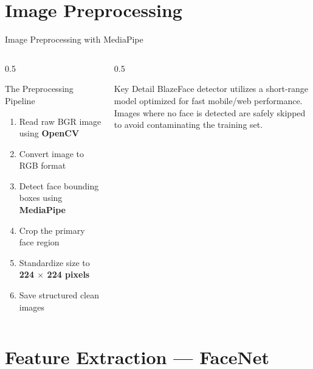 \documentclass[aspectratio=169]{beamer}
\begin{document}
\section{Image Preprocessing}

\begin{frame}{Image Preprocessing with MediaPipe}
  \begin{columns}
    \begin{column}{0.5\textwidth}
      \begin{block}{The Preprocessing Pipeline}
        \begin{enumerate}
          \item Read raw BGR image using \textbf{OpenCV}
          \item Convert image to RGB format
          \item Detect face bounding boxes using \textbf{MediaPipe}
          \item Crop the primary face region
          \item Standardize size to \textbf{224 $\times$ 224 pixels}
          \item Save structured clean images
        \end{enumerate}
      \end{block}
    \end{column}
    \begin{column}{0.5\textwidth}
      \begin{block}{Key Detail}
        BlazeFace detector utilizes a short-range model optimized for fast mobile/web performance.
        \\[0.5em]
        Images where no face is detected are safely skipped to avoid contaminating the training set.
      \end{block}
    \end{column}
  \end{columns}
\end{frame}

\section{Feature Extraction --- FaceNet}
\end{document}
